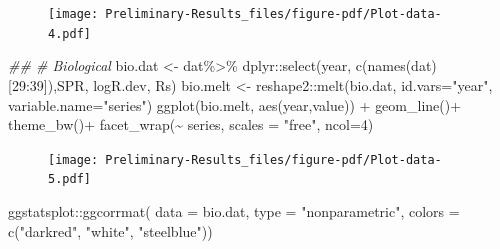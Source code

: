 \documentclass[
  letterpaper,
  DIV=11,
  numbers=noendperiod]{scrartcl}
\newenvironment{Shaded}{\begin{snugshade}}{\end{snugshade}}
\newcommand{\AttributeTok}[1]{\textcolor[rgb]{0.40,0.45,0.13}{#1}}
\newcommand{\DecValTok}[1]{\textcolor[rgb]{0.68,0.00,0.00}{#1}}
\newcommand{\DocumentationTok}[1]{\textcolor[rgb]{0.37,0.37,0.37}{\textit{#1}}}
\newcommand{\FunctionTok}[1]{\textcolor[rgb]{0.28,0.35,0.67}{#1}}
\newcommand{\NormalTok}[1]{\textcolor[rgb]{0.00,0.23,0.31}{#1}}
\newcommand{\OtherTok}[1]{\textcolor[rgb]{0.00,0.23,0.31}{#1}}
\newcommand{\SpecialCharTok}[1]{\textcolor[rgb]{0.37,0.37,0.37}{#1}}
\newcommand{\StringTok}[1]{\textcolor[rgb]{0.13,0.47,0.30}{#1}}
\begin{document}
\begin{figure}[H]

{\centering \texttt{[image: Preliminary-Results\_files/figure-pdf/Plot-data-4.pdf]}

}

\end{figure}

\begin{Shaded}
\begin{Highlighting}[]
\DocumentationTok{\#\# \# Biological }
\NormalTok{bio.dat }\OtherTok{\textless{}{-}}\NormalTok{ dat}\SpecialCharTok{\%\textgreater{}\%} 
\NormalTok{  dplyr}\SpecialCharTok{::}\FunctionTok{select}\NormalTok{(year,  }\FunctionTok{c}\NormalTok{(}\FunctionTok{names}\NormalTok{(dat)[}\DecValTok{29}\SpecialCharTok{:}\DecValTok{39}\NormalTok{]),SPR, logR.dev, Rs)}
\NormalTok{bio.melt }\OtherTok{\textless{}{-}}\NormalTok{ reshape2}\SpecialCharTok{::}\FunctionTok{melt}\NormalTok{(bio.dat, }\AttributeTok{id.vars=}\StringTok{"year"}\NormalTok{, }\AttributeTok{variable.name=}\StringTok{"series"}\NormalTok{)}
\FunctionTok{ggplot}\NormalTok{(bio.melt, }\FunctionTok{aes}\NormalTok{(year,value)) }\SpecialCharTok{+}
  \FunctionTok{geom\_line}\NormalTok{()}\SpecialCharTok{+} 
  \FunctionTok{theme\_bw}\NormalTok{()}\SpecialCharTok{+}
  \FunctionTok{facet\_wrap}\NormalTok{(}\SpecialCharTok{\textasciitilde{}}\NormalTok{ series, }\AttributeTok{scales =} \StringTok{"free"}\NormalTok{, }\AttributeTok{ncol=}\DecValTok{4}\NormalTok{)}
\end{Highlighting}
\end{Shaded}

\begin{figure}[H]

{\centering \texttt{[image: Preliminary-Results\_files/figure-pdf/Plot-data-5.pdf]}

}

\end{figure}

\begin{Shaded}
\begin{Highlighting}[]
\NormalTok{ggstatsplot}\SpecialCharTok{::}\FunctionTok{ggcorrmat}\NormalTok{(}
  \AttributeTok{data =}\NormalTok{ bio.dat,}
  \AttributeTok{type =} \StringTok{"nonparametric"}\NormalTok{,}
  \AttributeTok{colors =} \FunctionTok{c}\NormalTok{(}\StringTok{"darkred"}\NormalTok{, }\StringTok{"white"}\NormalTok{, }\StringTok{"steelblue"}\NormalTok{))}
\end{Highlighting}
\end{Shaded}
\end{document}
